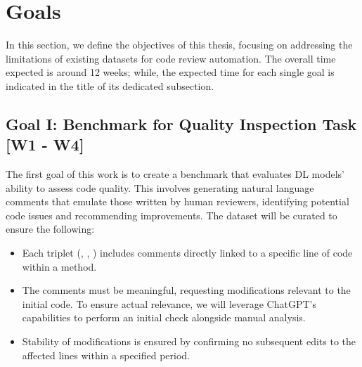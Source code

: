 \section{Goals}

In this section, we define the objectives of this thesis, focusing on
addressing the limitations of existing datasets for code review automation. 
The overall time expected 
is around 12 weeks; while, the expected time for each single goal is indicated in the title of its dedicated subsection.


\subsection{Goal I: Benchmark for Quality Inspection Task [W1 - W4]}

The first goal of this work is to create a benchmark that evaluates DL models'
ability to assess code quality. This involves generating natural language
comments that emulate those written by human reviewers, identifying potential
code issues and recommending improvements. The dataset will be curated to
ensure the following:
\begin{itemize}
    \item Each triplet (\subCode, \revComment, \revCode) includes comments directly
          linked to a specific line of code within a method.
    \item The comments must be meaningful, requesting modifications relevant to the
          initial code. To ensure actual relevance, we will leverage ChatGPT's capabilities 
          to perform an initial check alongside manual analysis.
    \item Stability of modifications is ensured by confirming no subsequent edits to the
          affected lines within a specified period.
\end{itemize}

